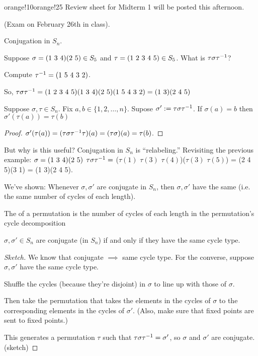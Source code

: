 \documentclass[notes.tex]{subfiles}
\begin{document}
\begin{classnote}{orange!10}{orange!25}
	Review sheet for Midterm 1 will be posted this afternoon.

	(Exam on February 26th in class).
\end{classnote}

Conjugation in $S_n$.

\begin{eg}
	Suppose $\sigma = \text{(1 3 4)}\text{(2 5)}\in S_5$ and $\tau=\text{(1 2 3 4 5)}\in S_5$.
	What is $\tau\sigma{\tau}^{-1}$?

	Compute ${\tau}^{-1}=\text{(1 5 4 3 2)}$.

	So, $\tau\sigma{\tau}^{-1} = \text{(1 2 3 4 5)}\text{(1 3 4)}\text{(2 5)}\text{(1 5 4 3 2)} = \text{(1 3)}\text{(2 4 5)}$
\end{eg}

\begin{proposition}
	Suppose $\sigma, \tau \in S_n$.
	Fix $a, b\in \{1,2,\ldots, n\}$.
	Supose $\sigma' := \tau\sigma{\tau}^{-1}$.
	If $\sigma(a) = b$ then $\sigma'(\tau(a)) = \tau(b)$
\end{proposition}
\begin{proof}
	$\sigma'(\tau(a)) = (\tau\sigma{\tau}^{-1}\tau)(a) = (\tau\sigma)(a) = \tau(b)$.
\end{proof}
But why is this useful?
Conjugation in $S_n$ is ``relabeling.'' 
Revisiting the previous example:
$\sigma = \text{(1 3 4)}\text{(2 5)}$
$\tau\sigma{\tau}^{-1} = $ ($\tau(1)$ $\tau(3)$ $\tau(4)$)($\tau(3)$ $\tau(5)$) = (2 4 5)(3 1) = (1 3)(2 4 5).

We've shown: Whenever $\sigma, \sigma'$ are conjugate in $S_n$, then $\sigma, \sigma'$ have the same  (i.e. the same number of cycles of each length).

\begin{defn}
	The  of a permutation is the number of cycles of each length in the permutation's cycle decomposition
\end{defn}

\begin{theorem}
	$\sigma, \sigma'\in S_n$ are conjugate (in $S_n$) if and only if they have the same cycle type.
\end{theorem}
\begin{proof}[Sketch]
	We know that conjugate $\implies$ same cycle type.
	For the converse, suppose $\sigma, \sigma'$ have the same cycle type.

	Shuffle the cycles (because they're disjoint) in $\sigma$ to line up with those of $\sigma$. 

	Then take the permutation that takes the elements in the cycles of $\sigma$ to the corresponding elements in the cycles of $\sigma'$. (Also, make sure that fixed points are sent to fixed points.)

	This generates a permutation $\tau$ such that $\tau\sigma{\tau}^{-1} = \sigma'$, so $\sigma$ and $\sigma'$ are conjugate.
	\qedhere(sketch)
\end{proof}
\end{document}
